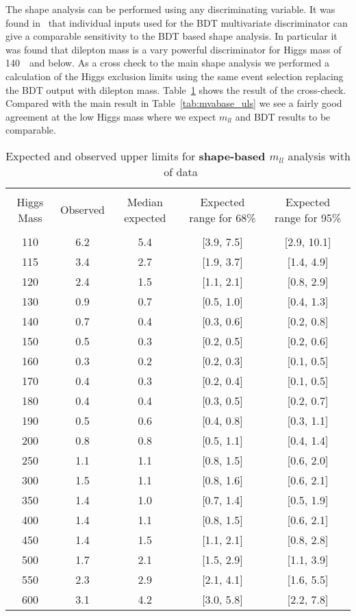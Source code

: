The shape analysis can be performed using any discriminating
variable. It was found in~\cite{MVASyst} that individual inputs used
for the BDT multivariate discriminator can give a comparable
sensitivity to the BDT based shape analysis. In particular it was
found that dilepton mass is a vary powerful discriminator for Higgs
mass of 140~\GeV\ and below. As a cross check to the main shape
analysis we performed a calculation of the Higgs exclusion limits
using the same event selection replacing the BDT output with dilepton
mass. Table~\ref{tab:altshape} shows the result of the
cross-check. Compared with the main result in
Table~\ref{tab:mvabase_uls} we see a fairly good agreement at the low
Higgs mass where we expect $m_{ll}$ and BDT results to be comparable.

\begin{table}[!hbp]
\begin{center}
\begin{tabular}{c c c c c}
\hline
\vspace{-3mm} && \\
 Higgs Mass   & Observed & Median expected & Expected range for 68\% & Expected range for 95\%   \\
\vspace{-3mm} && \\
\hline
110 & 6.2 & 5.4 & [3.9, 7.5] & [2.9, 10.1] \\
115 & 3.4 & 2.7 & [1.9, 3.7] & [1.4, 4.9] \\
120 & 2.4 & 1.5 & [1.1, 2.1] & [0.8, 2.9] \\
130 & 0.9 & 0.7 & [0.5, 1.0] & [0.4, 1.3] \\
140 & 0.7 & 0.4 & [0.3, 0.6] & [0.2, 0.8] \\
150 & 0.5 & 0.3 & [0.2, 0.5] & [0.2, 0.6] \\
160 & 0.3 & 0.2 & [0.2, 0.3] & [0.1, 0.5] \\
170 & 0.4 & 0.3 & [0.2, 0.4] & [0.1, 0.5] \\
180 & 0.4 & 0.4 & [0.3, 0.5] & [0.2, 0.7] \\
190 & 0.5 & 0.6 & [0.4, 0.8] & [0.3, 1.1] \\
200 & 0.8 & 0.8 & [0.5, 1.1] & [0.4, 1.4] \\
250 & 1.1 & 1.1 & [0.8, 1.5] & [0.6, 2.0] \\
300 & 1.5 & 1.1 & [0.8, 1.6] & [0.6, 2.1] \\
350 & 1.4 & 1.0 & [0.7, 1.4] & [0.5, 1.9] \\
400 & 1.4 & 1.1 & [0.8, 1.5] & [0.6, 2.1] \\
450 & 1.4 & 1.5 & [1.1, 2.1] & [0.8, 2.8] \\
500 & 1.7 & 2.1 & [1.5, 2.9] & [1.1, 3.9] \\
550 & 2.3 & 2.9 & [2.1, 4.1] & [1.6, 5.5] \\
600 & 3.1 & 4.2 & [3.0, 5.8] & [2.2, 7.8] \\
\hline
\end{tabular}
\caption{Expected and observed upper limits for {\bf shape-based
    $m_{ll}$} analysis with \intlumi\ of data}
\label{tab:altshape}
\end{center}
\end{table}



